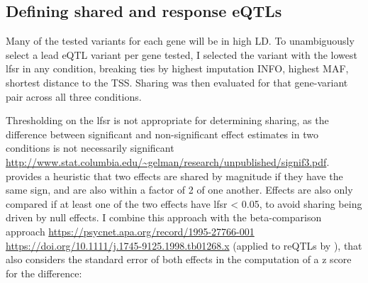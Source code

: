 \subsection{Defining shared and response eQTLs}

Many of the tested variants for each gene will be in high \gls{LD}.
To unambiguously select a lead \gls{eQTL} variant per gene tested, I selected the variant with the lowest lfsr in any condition, breaking ties by highest imputation INFO, highest \gls{MAF}, shortest distance to the \gls{TSS}.
Sharing was then evaluated for that gene-variant pair across all three conditions.

Thresholding on the lfsr is not appropriate for determining sharing, as the difference between significant and non-significant effect estimates in two conditions is not necessarily significant \url{http://www.stat.columbia.edu/~gelman/research/unpublished/signif3.pdf}.
\autocite{urbut2018FlexibleStatisticalMethods} provides a heuristic that two effects are shared by magnitude if they have the same sign, and are also within a factor of 2 of one another.
Effects are also only compared if at least one of the two effects have lfsr < 0.05, to avoid sharing being driven by null effects.
%
%
I combine this approach with the beta-comparison approach \url{https://psycnet.apa.org/record/1995-27766-001} \url{https://doi.org/10.1111/j.1745-9125.1998.tb01268.x} \autocite{schenker2001JudgingSignificanceDifferences} (applied to reQTLs by \autocite{kim-hellmuth2017GeneticRegulatoryEffects}), that also considers the standard error of both effects in the computation of a z score for the difference:

